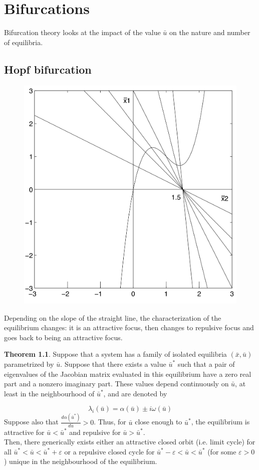 \documentclass[12pt, openany]{report}
\theoremstyle{definition}
\newtheorem{thm}{Theorem}[chapter]
\begin{document}
\chapter{Bifurcations}
Bifurcation theory looks at the impact of the value \(\bar u\) on the nature and number of equilibria. 
\section{Hopf bifurcation}
\begin{figure}[H]
    \centering
    \includegraphics[width = .4\textwidth]{img/hopf_bif.png}
\end{figure}
Depending on the slope of the straight line, the characterization of the equilibrium changes: it is an attractive focus, then changes to repulsive focus and goes back to being an attractive focus.
\begin{thm}
    Suppose that a system has a family of isolated equilibria \((\bar x,\bar u)\) parametrized by \(\bar u\). Suppose that there exists a value \(\bar u^*\) such that a pair of eigenvalues of the Jacobian matrix evaluated in this equilibrium have a zero real part and a nonzero imaginary part. These values depend continuously on \(\bar u\), at least in the neighbourhood of \(\bar u^*\), and are denoted by
\end{thm}
\begin{equation}
    \lambda_i(\bar u) = \alpha(\bar u)\pm i\omega(\bar u)
\end{equation}
Suppose also that \(\frac{d\alpha (\bar u^*)}{d\bar u}>0\). Thus, for \(\bar u\) close enough to \(\bar u^*\), the equilibrium is attractive for \(\bar u<\bar u^*\) and repulsive for \(\bar u>\bar u^*\). \\
Then, there generically exists either an attractive closed orbit (i.e. limit cycle) for all \(\bar u^*<\bar u<\bar u^*+\varepsilon\) or a repulsive closed cycle for \(\bar u^*-\varepsilon < \bar u < \bar u^*\) (for some \(\varepsilon>0\)) unique in the neighbourhood of the equilibrium.
\end{document}
